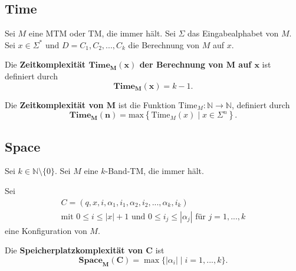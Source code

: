 \documentclass[a4paper, 11pt]{article}
\def\N{\mathbb{N}}
\begin{document}
                       \subsection{Time}
                            \begin{mainbox}{}
                                Sei $M$ eine MTM oder TM, die immer hält. Sei $\Sigma$ das Eingabealphabet von $M$. 
                                Sei $x \in \Sigma^*$ und $D = C_1, C_2, ...,C_k$ die Berechnung von $M$ auf $x$.
                                
                                
                                Die \textbf{Zeitkomplexität $\mathbf{\textbf{Time}_M(x)}$ der 
                                Berechnung von $\mathbf{M}$ auf $\mathbf{x}$} ist definiert durch
                                $$\mathbf{\textbf{Time}_M(x)} = k-1.$$
                                
                                
                                Die \textbf{Zeitkomplexität von $\mathbf{M}$} ist die Funktion $\text{Time}_M: \N \to \N$, definiert durch
                                $$\mathbf{\textbf{Time}_M(n)} = \text{max}\left\{\text{Time}_M(x) \mid x \in \Sigma^n\right\}.$$
                            \end{mainbox}
                   
                        
                        \subsection{Space}
                            \begin{mainbox}{}
                                Sei $k \in \N\setminus\{0\}$. Sei $M$ eine $k$-Band-TM, die immer hält.
                        
                                Sei 
                                \begin{align*}
                                    C = (q, x, i, \alpha_1, i_1, \alpha_2, i_2, ..., \alpha_k, i_k)\\
                                    \text{mit }0 \leq i \leq |x|+1 \text{ und } 0 \leq i_j \leq |\alpha_j| \text{ für } j = 1, ..., k
                                \end{align*}
                                eine Konfiguration von $M$. 
                                
                                
                                Die \textbf{Speicherplatzkomplexität von $\mathbf{C}$} ist 
                                $$\mathbf{\textbf{Space}_M(C)} = \max\{|\alpha_i| \mid i = 1, ..., k\}.$$
                            \end{mainbox}
                     
\end{document}
